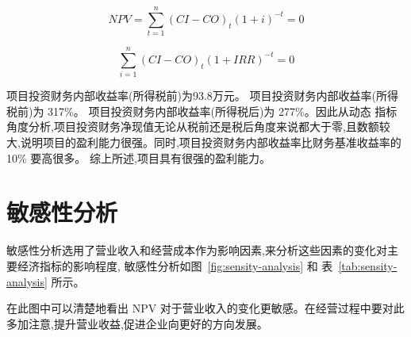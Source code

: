 \begin{equation}
\label{eq:npv}
        NPV = \sum _{t = 1}^{n} (CI - CO)_{t} (1 + i)^{-t} = 0
\end{equation}

\begin{equation}
\label{eq:irr}
        \sum _{i = 1}^{n} (CI - CO)_{t} (1 + IRR)^{-t} = 0
\end{equation}

项目投资财务内部收益率(所得税前)为93.8万元。
项目投资财务内部收益率(所得税前)为 317\%。
项目投资财务内部收益率(所得税后)为 277\%。因此从动态
指标角度分析,项目投资财务净现值无论从税前还是税后角度来说都大于零,且数额较
大,说明项目的盈利能力很强。同时,项目投资财务内部收益率比财务基准收益率的 10\%
要高很多。
综上所述,项目具有很强的盈利能力。

\section{敏感性分析}
敏感性分析选用了营业收入和经营成本作为影响因素,来分析这些因素的变化对主
要经济指标的影响程度, 敏感性分析如图~\ref{fig:sensity-analysis} 和
表~\ref{tab:sensity-analysis} 所示。


在此图中可以清楚地看出 NPV 对于营业收入的变化更敏感。在经营过程中要对此
多加注意,提升营业收益,促进企业向更好的方向发展。
